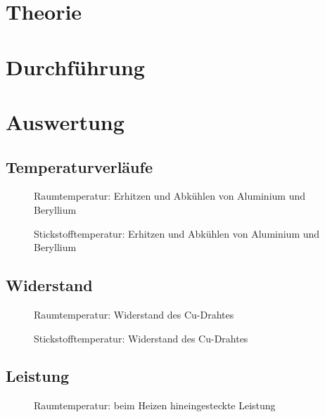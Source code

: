 \documentclass[12pt,a4paper,titlepage,headinclude,bibtotoc]{scrartcl}
\begin{document}
\section{Theorie}
\label{sec:theorie}

\section{Durchführung}
\label{sec:durchfuehrung}

\section{Auswertung}
\label{sec:auswertung}
\subsection{Temperaturverläufe}
\begin{figure}[!htb]
	\centering
	
	\caption{Raumtemperatur: Erhitzen und Abkühlen von Aluminium und Beryllium}
	\label{fig:Raumtemp}
\end{figure}

\begin{figure}[!htb]
	\centering
	
	\caption{Stickstofftemperatur: Erhitzen und Abkühlen von Aluminium und Beryllium}
	\label{fig:Stickstofftemp}
\end{figure}

\subsection{Widerstand}
\begin{figure}[!htb]
	\centering
	
	\caption{Raumtemperatur: Widerstand des Cu-Drahtes}
	\label{fig:Widerstand_Raum}
\end{figure}

\begin{figure}[!htb]
	\centering
	
	\caption{Stickstofftemperatur: Widerstand des Cu-Drahtes}
	\label{fig:Widerstand_Stick}
\end{figure}

\subsection{Leistung}
\begin{figure}[!htb]
	\centering
	
	\caption{Raumtemperatur: beim Heizen hineingesteckte Leistung}
	\label{fig:Leistung_Raum}
\end{figure}
\end{document}
